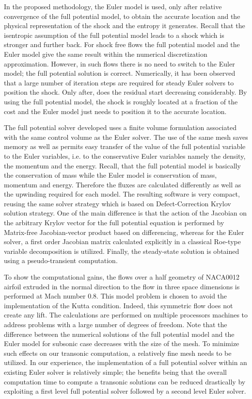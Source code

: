 \documentclass[11pt]{article}
\begin{document}
In the proposed methodology, the Euler model is used, only after
relative convergence of the full potential model, to obtain the
accurate location and the physical representation of the shock and the
entropy it generates. Recall that the isentropic assumption of the
full potential model leads to a shock which is stronger and further
back. For shock free flows the full potential model and the Euler
model give the same result within the numerical discretization
approximation. However, in such flows there is no need to switch to
the Euler model; the full potential solution is correct. Numerically,
it has been observed that a large number of iteration steps are
required for steady Euler solvers to position the shock. Only after,
does the residual start decreasing considerably. By using the full
potential model, the shock is roughly located at a fraction of the
cost and the Euler model just needs to position it to the accurate
location.

The full potential solver developed uses a finite volume formulation
associated with the same control volume as the Euler solver. The use
of the same mesh saves memory as well as permits easy transfer of the
value of the full potential variable to the Euler variables, i.e. to
the conservative Euler variables namely the density, the momentum and
the energy. Recall, that the full potential model is basically the
conservation of mass while the Euler model is conservation of mass,
momentum and energy. Therefore the fluxes are calculated differently
as well as the upwinding required for each model. The resulting
software is very compact, reusing the same solver strategy which is
based on Defect-Correction Krylov solution strategy. One of the main
difference is that the action of the Jacobian on the arbitrary Krylov
vector for the full potential equation is performed by Matrix-free
Jacobian-vector product based on differencing, whereas for the Euler
solver, a first order Jacobian matrix calculated explicitly in a
classical Roe-type variable decomposition is utilized. Finally, the
steady-state solution is obtained using a pseudo-transient
computation.

To show the computational gains, the flows over a half geometry of
NACA0012 airfoil extruded in the normal direction to the flow in three
space dimensions is performed at Mach number 0.8. This model problem
is chosen to avoid the implementation of the Kutta condition. Indeed,
this symmetric flow does not create any lift.  The calculations are
performed on multiple processors machines to address problems with a
large number of degrees of freedom. Note that the difference between
the numerical solutions of the full potential model and the Euler
model for subsonic case decreases with the size of the mesh. To
minimize such effects on our transonic computation, a relatively fine
mesh needs to be utilized. In our experience, the implementation of a
full potential solver within an existing Euler solver is relatively
simple; the benefits being that the overall computation time to
compute a transonic solutions can be reduced drastically by exploiting
a first level full potential solver followed by a second level Euler
solver.
\end{document}

